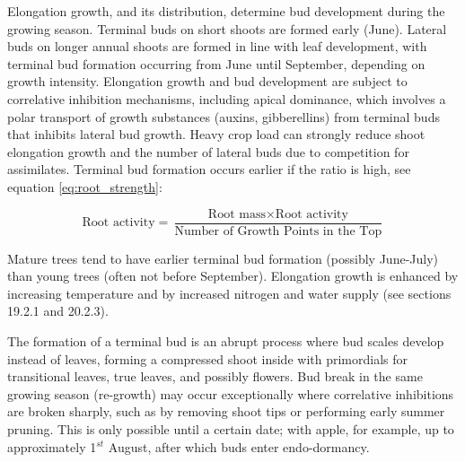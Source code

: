 \vspace{0.5em}
Elongation growth, and its distribution, determine bud development during the growing season. Terminal buds on short shoots are formed early (June). Lateral buds on longer annual shoots are formed in line with leaf development, with terminal bud formation occurring from June until September, depending on growth intensity. Elongation growth and bud development are subject to correlative inhibition mechanisms, including apical dominance, which involves a polar transport of growth substances (auxins, gibberellins) from terminal buds that inhibits lateral bud growth. Heavy crop load can strongly reduce shoot elongation growth and the number of lateral buds due to competition for assimilates. Terminal bud formation occurs earlier if the ratio is high, see equation \ref{eq:root_strength}:

\begin{equation}
    \text{Root activity} = 
    \dfrac{\text{Root mass} \times \text{Root activity}}
          {\text{Number of Growth Points in the Top}}
    \label{eq:root_strength}
\end{equation}

\vspace{0.5em}
Mature trees tend to have earlier terminal bud formation (possibly June-July) than young trees (often not before September). Elongation growth is enhanced by increasing temperature and by increased nitrogen and water supply (see sections 19.2.1 and 20.2.3).

\vspace{0.5em}
The formation of a terminal bud is an abrupt process where bud scales develop instead of leaves, forming a compressed shoot inside with primordials for transitional leaves, true leaves, and possibly flowers. Bud break in the same growing season (re-growth) may occur exceptionally where correlative inhibitions are broken sharply, such as by removing shoot tips or performing early summer pruning. This is only possible until a certain date; with apple, for example, up to approximately 1$^{st}$ August, after which buds enter endo-dormancy.

